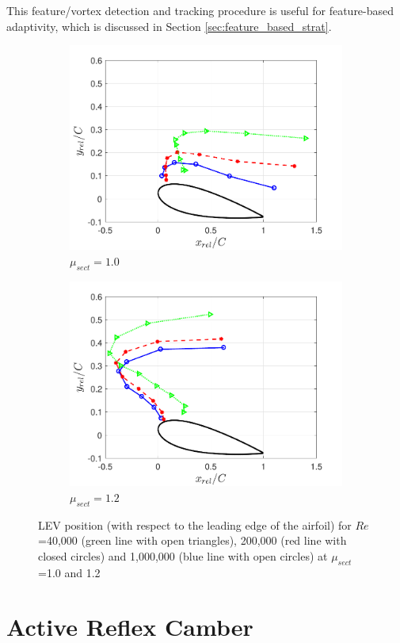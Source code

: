 This feature/vortex detection and tracking procedure is useful for feature-based adaptivity, which is discussed in Section \ref{sec:feature_based_strat}.

\begin{figure}[H]
	\begin{subfigure}{0.5\textwidth}
		\includegraphics[width=1\textwidth]{figures/LEV_location_lambda_1pt0}
		\caption{$\mu_{sect} = 1.0$}
		\label{fig:LEV_location_lambda_1p0}
	\end{subfigure}
	\begin{subfigure}{0.5\textwidth}
		\includegraphics[width=1\textwidth]{figures/LEV_location_lambda_1pt2}
		\caption{$\mu_{sect} = 1.2$}
		\label{fig:LEV_location_lambda_1p2}
	\end{subfigure}
 	\caption{LEV position (with respect to the leading edge of the airfoil) for $Re$=40,000 (green line with open triangles), 200,000 (red line with closed circles) and 1,000,000 (blue line with open circles) at $\mu_{sect}$=1.0 and 1.2}
	\label{fig:LEV_location_LE_airfoil}
\end{figure}

\section{Active Reflex Camber}



